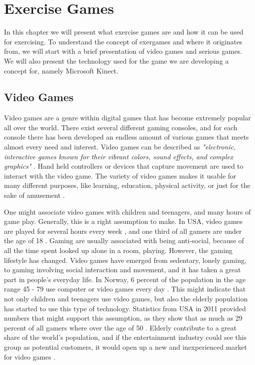 \chapter{Exercise Games}
\label{chap:exergames}
In this chapter we will present what exercise games are and how it can be used for exercising. To understand the concept of exergames and where it originates from, we will start with a brief presentation of video games and serious games. We will also present the technology used for the game we are developing a concept for, namely Microsoft Kinect. 

\section{Video Games}

Video games are a genre within digital games that has become extremely popular all over the world. There exist several different gaming consoles, and for each console there has been developed an endless amount of various games that meets almost every need and interest. Video games can be described as \emph{"electronic, interactive games known for their vibrant colors, sound effects, and complex graphics"} \cite{videogamedef}. Hand held controllers or devices that capture movement are used to interact with the video game. The variety of video games makes it usable for many different purposes, like learning, education, physical activity, or just for the sake of amusement \cite{project}. 

One might associate video games with children and teenagers, and many hours of game play. Generally, this is a right assumption to make. In USA, video games are played for several hours every week \cite{foxnews}, and one third of all gamers are under the age of 18 \cite{videogames2012}. Gaming are usually associated with being anti-social, because of all the time spent looked up alone in a room, playing. However, the gaming lifestyle has changed. Video games have emerged from sedentary, lonely gaming, to gaming involving social interaction and movement, and it has taken a great part in people's everyday life. In Norway, 6 percent of the population in the age range 45 - 79 use computer or video games every day \cite{mediebarometer2012}. This might indicate that not only children and teenagers use video games, but also the elderly population has started to use this type of technology. Statistics from USA in 2011 provided numbers that might support this assumption, as they show that as much as 29 percent of all gamers where over the age of 50 \cite{videogames2011}. Elderly contribute to a great share of the world's population, and if the entertainment industry could see this group as potential customers, it would open up a new and inexperienced market for video games \cite{ijsselsteijn2007digital}. 

